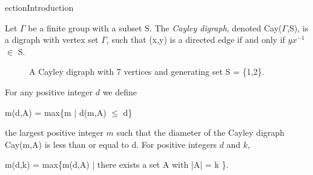ection{Introduction}

Let $\Gamma$ be a finite group with a subset S. The \emph{Cayley digraph}, denoted Cay($\Gamma$,S), is a digraph with vertex set $\Gamma$, such that (x,y) is a directed edge if and only if $yx^{-1}$ $\in$ S. 

 
 \begin{figure}[h]
 \begin{center}

 \end{center}
 \caption{ A Cayley digraph with 7 vertices and generating set S = \{1,2\}.}
 \end{figure}

 For any positive integer $d$ we define

 \begin{center}
 m(d,A) = max\{m | d(m,A) $\leq$ d\}
 \end{center}

 the largest positive integer $m$ such that the diameter of the Cayley digraph Cay(m,A) is less than or equal to d. For positive integers $d$ and $k$, 

 \begin{center}
 m(d,k) = max\{m(d,A) | there exists a set A with |A| = k \}.
 \end{center}

